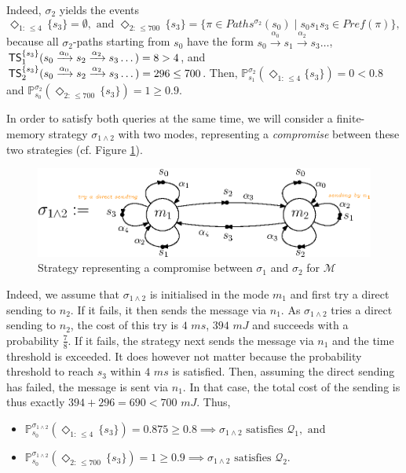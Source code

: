 \begin{example}
  Indeed, $\sigma_2$ yields the events
  \[
    \Diamond_{1:\, \leq 4} \, \{s_3\} = \emptyset, \text{ and }
    \Diamond_{2:\, \leq 700} \, \{s_3\} = \{\pi \in Paths^{\sigma_2}(s_0) \; | \; s_0s_1s_3 \in Pref(\pi)\},
  \]
  because all $\sigma_2$-paths starting from $s_0$ have the form $s_0\xrightarrow{\alpha_0}s_1\xrightarrow{\alpha_2}s_3\dots$,
  $\text{\sffamily TS}^{\{s_3\}}_1(s_0\xrightarrow{\alpha_0}s_2\xrightarrow{\alpha_2}s_3\dots) = 8 > 4$, and $\text{\sffamily TS}^{\{s_3\}}_2(s_0\xrightarrow{\alpha_0}s_2\xrightarrow{\alpha_2}s_3 \dots) = 296 \leq 700$. Then,
  $\mathbb{P}_{s_1}^{\sigma_2}(\Diamond_{1:\, \leq 4}\{s_3\}) = 0 < 0.8$ and $\mathbb{P}_{s_0}^{\sigma_2}(\Diamond_{2: \, \leq 700} \, \{s_3\}) = 1 \geq 0.9$.
  \par In order to satisfy both queries at the same
  time, we will consider a finite-memory strategy
  $\sigma_{1\wedge2}$ with two modes, representing
  a \textit{compromise} between these two strategies (cf.
  Figure \ref{strat-compromise}).
  \begin{figure}[h]
    \centering
    \includegraphics[width=0.7\linewidth]{resources/strategy2}
    \caption{Strategy representing a compromise between $\sigma_1$ and $\sigma_2$ for $\mathcal{M}$}
    \label{strat-compromise}
  \end{figure}
  Indeed, we assume that $\sigma_{1 \wedge 2}$ is initialised in the mode $m_1$ and first try a direct sending to $n_2$. If it fails, it then sends the message via $n_1$.
  As $\sigma_{1 \wedge 2}$ tries a direct sending to $n_2$,
    the cost of this try is $4$ $ms$, $394$ $mJ$ and succeeds with a probability $\frac{7}{8}$.
    If it fails, the strategy next sends the message via $n_1$ and the time threshold is exceeded.
    It does however not matter because the probability threshold to reach $s_3$ within $4$ $ms$ is satisfied. Then, assuming the direct sending has failed, the message is sent via $n_1$. In that case, the total cost of the sending is thus exactly $394 + 296 = 690 < 700$ $mJ$. Thus,
  \begin{itemize}
    \item $\mathbb{P}_{s_0}^{\sigma_{1 \wedge 2}}(\Diamond_{1:\, \leq 4}\, \{s_3\}) = 0.875 \geq 0.8 \implies \sigma_{1 \wedge 2} \text{ satisfies }\mathcal{Q}_1, \text{ and}$
    \item $\mathbb{P}_{s_0}^{\sigma_{1 \wedge 2}}(\Diamond_{2:\, \leq 700}\, \{s_3\}) = 1 \geq 0.9 \implies \sigma_{1 \wedge 2} \text{ satisfies }\mathcal{Q}_2.$
  \end{itemize}


\end{example}
